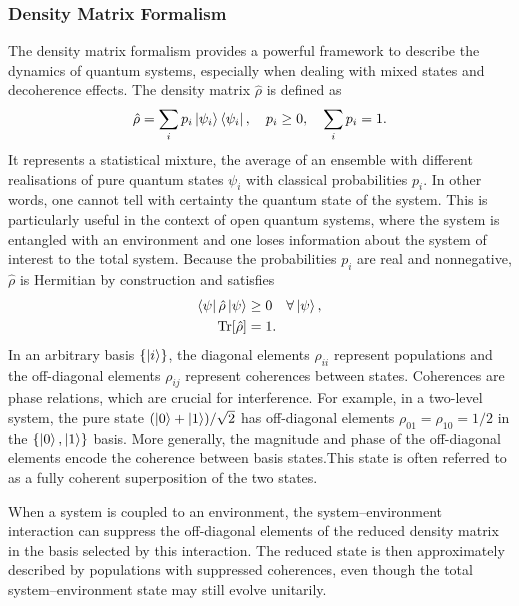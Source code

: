 \subsubsection{Density Matrix Formalism}
The density matrix formalism provides a powerful framework to describe the dynamics of quantum systems, especially when dealing with mixed states and decoherence effects.
The density matrix \(\hat{\rho}\) is defined as \cite{campaiolietal2024quantummasterequations}
\begin{equation}
	\hat{\rho} = \sum_i p_i \ket{\psi_i}\bra{\psi_i}, \quad p_i \geq 0, \quad \sum_i p_i = 1.
	\label{eq:oqs_DensityMatrix}
\end{equation}
It represents a statistical mixture, the average of an ensemble with different realisations of pure quantum states $\psi_i$ with classical probabilities $p_i$. In other words, one cannot tell with certainty the quantum state of the system. This is particularly useful in the context of open quantum systems, where the system is entangled with an environment and one loses information about the system of interest to the total system.
Because the probabilities $p_i$ are real and nonnegative, $\hat{\rho}$ is Hermitian by construction and satisfies
\begin{align*}
	\bra{\psi} \hat{\rho} \ket{\psi} & \geq 0 \quad \forall \ket{\psi}, \notag\\
	\mathrm{Tr}[\hat{\rho}]          & = 1. \notag
\end{align*}
In an arbitrary basis $\{\ket{i}\}$, the diagonal elements $\rho_{ii}$ represent populations and the off-diagonal elements $\rho_{ij}$ represent coherences between states.
Coherences are phase relations, which are crucial for interference.
For example, in a two-level system, the pure state \((\ket{0}+\ket{1})/\sqrt{2}\) has off-diagonal elements \(\rho_{01}=\rho_{10}=1/2\) in the \(\{\ket{0},\ket{1}\}\) basis. More generally, the magnitude and phase of the off-diagonal elements encode the coherence between basis states.This state is often referred to as a fully coherent superposition of the two states.

When a system is coupled to an environment, the system--environment interaction can suppress the off-diagonal elements of the reduced density matrix in the basis selected by this interaction. The reduced state is then approximately described by populations with suppressed coherences, even though the total system--environment state may still evolve unitarily.

